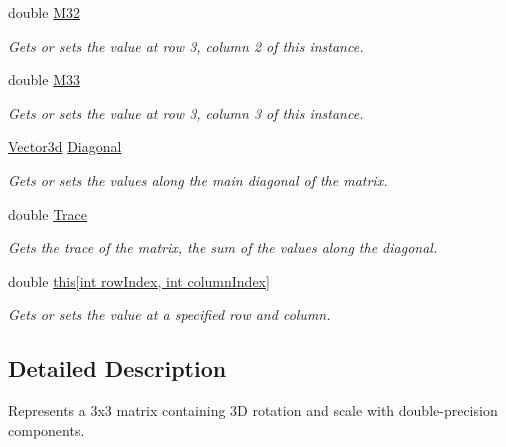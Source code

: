 \begin{DoxyCompactItemize}
double \hyperlink{struct_open_t_k_1_1_matrix3d_abfd29a3e41fcf8decb6c1a4d94e8770b}{M32}
\begin{DoxyCompactList}\small\item\em Gets or sets the value at row 3, column 2 of this instance. \end{DoxyCompactList}\item 
double \hyperlink{struct_open_t_k_1_1_matrix3d_a0f16e84509ccfee6c6213656840e8ad3}{M33}
\begin{DoxyCompactList}\small\item\em Gets or sets the value at row 3, column 3 of this instance. \end{DoxyCompactList}\item 
\hyperlink{struct_open_t_k_1_1_vector3d}{Vector3d} \hyperlink{struct_open_t_k_1_1_matrix3d_af9f7cfaf431f57314db21674ea20132a}{Diagonal}
\begin{DoxyCompactList}\small\item\em Gets or sets the values along the main diagonal of the matrix. \end{DoxyCompactList}\item 
double \hyperlink{struct_open_t_k_1_1_matrix3d_a096edfdf4c86e3fa308bdaedcf14dfc3}{Trace}
\begin{DoxyCompactList}\small\item\em Gets the trace of the matrix, the sum of the values along the diagonal. \end{DoxyCompactList}\item 
double \hyperlink{struct_open_t_k_1_1_matrix3d_ae651986590b6de7df506784c9f5db97b}{this\mbox{[}int row\-Index, int column\-Index\mbox{]}}
\begin{DoxyCompactList}\small\item\em Gets or sets the value at a specified row and column. \end{DoxyCompactList}\end{DoxyCompactItemize}


\subsection{Detailed Description}
Represents a 3x3 matrix containing 3\-D rotation and scale with double-\/precision components. 



